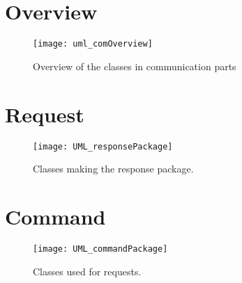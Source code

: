 \section{Overview}

\begin{figure}[h!]
\texttt{[image: uml\_comOverview]}

\caption{Overview of the classes in communication parts}
\label{fig:com_overview}
\end{figure}

\section{Request}
\begin{figure}[h!]
\texttt{[image: UML\_responsePackage]}

\caption{Classes making the response package.}
\label{fig:com_commandPackage}
\end{figure}


\section{Command}
\begin{figure}[h!]
\texttt{[image: UML\_commandPackage]}

\caption{Classes used for requests.}
\label{fig:com_commandPackage}
\end{figure}


